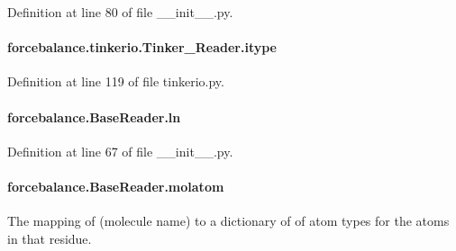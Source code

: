 Definition at line 80 of file \-\_\-\-\_\-init\-\_\-\-\_\-.\-py.

\hypertarget{classforcebalance_1_1tinkerio_1_1Tinker__Reader_a248491ef24b63a0c027d66d75e80e70e}{
\paragraph[{itype}]{\setlength{\rightskip}{0pt plus 5cm}forcebalance.\-tinkerio.\-Tinker\-\_\-\-Reader.\-itype}}\label{classforcebalance_1_1tinkerio_1_1Tinker__Reader_a248491ef24b63a0c027d66d75e80e70e}


Definition at line 119 of file tinkerio.\-py.

\hypertarget{classforcebalance_1_1BaseReader_a80c8e3bea212600742968aa8669e557b}{
\paragraph[{ln}]{\setlength{\rightskip}{0pt plus 5cm}forcebalance.\-Base\-Reader.\-ln\hspace{0.3cm}{\ttfamily [inherited]}}}\label{classforcebalance_1_1BaseReader_a80c8e3bea212600742968aa8669e557b}


Definition at line 67 of file \-\_\-\-\_\-init\-\_\-\-\_\-.\-py.

\hypertarget{classforcebalance_1_1BaseReader_ab444c213e15929253dd73395ac5f19fc}{
\paragraph[{molatom}]{\setlength{\rightskip}{0pt plus 5cm}forcebalance.\-Base\-Reader.\-molatom\hspace{0.3cm}{\ttfamily [inherited]}}}\label{classforcebalance_1_1BaseReader_ab444c213e15929253dd73395ac5f19fc}


The mapping of (molecule name) to a dictionary of of atom types for the atoms in that residue. 

